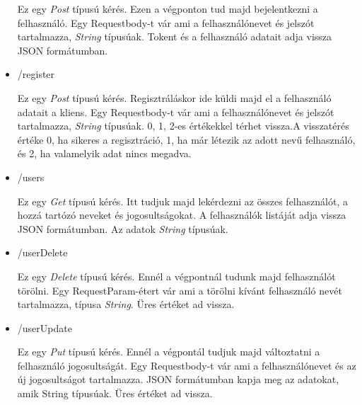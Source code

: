 \begin{itemize}
Ez egy \textit{Post} típusú kérés. Ezen a végponton tud majd bejelentkezni a felhasználó.
Egy Requestbody-t vár ami a felhasználónevet és jelszót tartalmazza, \textit{String} típusúak. Tokent és a felhasználó adatait adja vissza JSON formátumban.
\item /register

Ez egy \textit{Post} típusú kérés. Regisztráláskor ide küldi majd el a felhasználó adatait a kliens.
Egy Requestbody-t vár ami a felhasználónevet és jelszót tartalmazza, \textit{String} típusúak. 0, 1, 2-es értékekkel térhet vissza.A visszatérés értéke 0, ha sikeres a regisztráció, 1, ha már létezik az adott nevű felhasználó, és 2, ha valamelyik adat nincs megadva.  
\item /users

Ez egy \textit{Get} típusú kérés. Itt tudjuk majd lekérdezni az összes felhasználót, a hozzá tartózó neveket és jogosultságokat.
A felhasználók listáját adja vissza JSON formátumban. Az adatok \textit{String} típusúak.
\item /userDelete

Ez egy \textit{Delete} típusú kérés. Ennél a végpontnál tudunk majd felhasználót törölni.
Egy RequestParam-étert vár ami a törölni kívánt felhasználó nevét tartalmazza, típusa \textit{String}. Üres értéket ad vissza.
\item /userUpdate

Ez egy \textit{Put} típusú kérés. Ennél  a végpontál tudjuk majd változtatni a felhasználó jogosultságát.
Egy Requestbody-t vár ami a felhasználónevet és az új jogosultságot tartalmazza. JSON formátumban kapja meg az adatokat, amik String típusúak. Üres értéket ad vissza.

\end{itemize}









